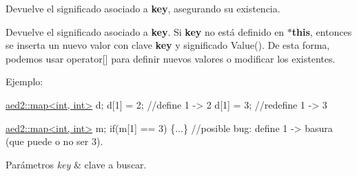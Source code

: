 Devuelve el significado asociado a {\bfseries key}, asegurando su existencia. 

Devuelve el significado asociado a {\bfseries key}. Si {\bfseries key} no está definido en {\bfseries $\ast$this}, entonces se inserta un nuevo valor con clave {\bfseries key} y significado Value(). De esta forma, podemos usar {\ttfamily operator\mbox{[}\mbox{]}} para definir nuevos valores o modificar los existentes.

Ejemplo\-: 
\begin{DoxyCode}
\hyperlink{classaed2_1_1map}{aed2::map<int, int>} d;
d[1] = 2;      \textcolor{comment}{//define 1 -> 2}
d[1] = 3;      \textcolor{comment}{//redefine 1 -> 3}

\hyperlink{classaed2_1_1map}{aed2::map<int, int>} m;
\textcolor{keywordflow}{if}(m[1] == 3) \{...\} \textcolor{comment}{//posible bug: define 1 -> basura (que puede o no ser}
3).
\end{DoxyCode}



\begin{DoxyParams}{Parámetros}
{\em key} & clave a buscar. \\
\hline
\end{DoxyParams}

